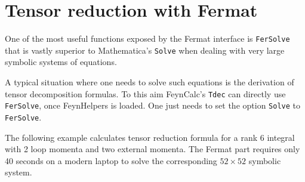 \documentclass[../FeynHelpersManual.tex]{subfiles}
\begin{document}
\hypertarget{tensor reduction with fermat}{
\section{Tensor reduction with Fermat}\label{tensor reduction with fermat}}

One of the most useful functions exposed by the Fermat interface is
\texttt{FerSolve} that is vastly superior to Mathematica's
\texttt{Solve} when dealing with very large symbolic systems of
equations.

A typical situation where one needs to solve such equations is the
derivation of tensor decomposition formulas. To this aim FeynCalc's
\texttt{Tdec} can directly use \texttt{FerSolve}, once FeynHelpers is
loaded. One just needs to set the option \texttt{Solve} to
\texttt{FerSolve}.

The following example calculates tensor reduction formula for a rank 6
integral with 2 loop momenta and two external momenta. The Fermat part
requires only 40 seconds on a modern laptop to solve the corresponding
\(52 \times 52\) symbolic system.

\begin{Shaded}
\begin{Highlighting}[]
\OperatorTok{[\{\{}\OperatorTok{,}\OperatorTok{\},} \OperatorTok{\{}\OperatorTok{,}\OperatorTok{\},} \OperatorTok{\{}\OperatorTok{,}\OperatorTok{\},} \OperatorTok{\{}\OperatorTok{,}\OperatorTok{\},} \OperatorTok{\{}\OperatorTok{,}\OperatorTok{\},} \OperatorTok{\{}\OperatorTok{,}\OperatorTok{\}\},}
\OperatorTok{\{}\OperatorTok{,}\OperatorTok{\},}  \OtherTok{{-}\textgreater{}}\OperatorTok{,}\OtherTok{{-}\textgreater{}} \OperatorTok{,}\OtherTok{{-}\textgreater{}} \OperatorTok{]}
\end{Highlighting}
\end{Shaded}
\end{document}

